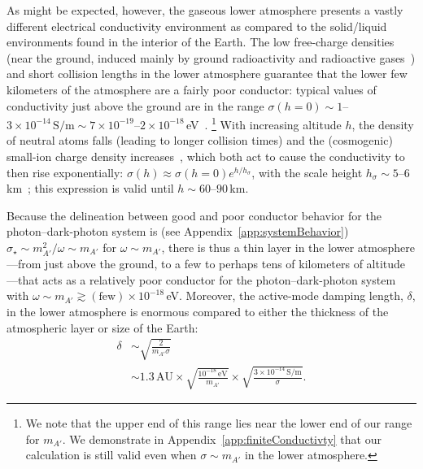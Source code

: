 \documentclass[amsmath,amssymb,aps,10pt,prd,letterpaper,nofootinbib,balancelastpage,notitlepage,superscriptaddress,twocolumn,floatfix]{revtex4-2}
\newcommand{\appref}[2][x]{Appendi{#1}~\ref{#2}}	%
\begin{document}
As might be expected, however, the gaseous lower atmosphere presents a vastly different electrical conductivity environment as compared to the solid/liquid environments found in the interior of the Earth.
The low free-charge densities (near the ground, induced mainly by ground radioactivity and radioactive gases~\cite{Handbook20.1}) and short collision lengths in the lower atmosphere guarantee that the lower few kilometers of the atmosphere are a fairly poor conductor: typical values of conductivity just above the ground are in the range 
$\sigma(h=0) \sim 1$--$3\times 10^{-14}\,\text{S/m}\sim 7\times 10^{-19}$--$2\times 10^{-18}$\,eV~\cite{Handbook20.1}.%
\footnote{\label{ftnt:conductivity}%
    We note that the upper end of this range lies near the lower end of our range for $m_{A'}$.  
    We demonstrate in \appref{app:finiteConductivty} that our calculation is still valid even when $\sigma\sim m_{A'}$ in the lower atmosphere.
} %
With increasing altitude $h$, the density of neutral atoms falls (leading to longer collision times) and the (cosmogenic) small-ion charge density increases~\cite{Handbook20.1}, which both act to cause the conductivity to then rise exponentially: $\sigma(h) \approx \sigma(h=0) e^{h/h_\sigma}$, with the scale height $h_\sigma \sim 5$--$6\,$km~\cite{Handbook20.1}; this expression is valid until $h\sim 60$--$90$\,km.

Because the delineation between good and poor conductor behavior for the photon--dark-photon system is (see \appref{app:systemBehavior}) $\sigma_{\star} \sim m_{A'}^2/\omega \sim m_{A'}$ for $\omega \sim m_{A'}$, there is thus a thin layer in the lower atmosphere---from just above the ground, to a few to perhaps tens of kilometers of altitude---that acts as a relatively poor conductor for the photon--dark-photon system with $\omega \sim m_{A'} \gtrsim (\text{few}) \times 10^{-18}\,$eV. 
Moreover, the active-mode damping length, $\delta$, in the lower atmosphere is enormous compared to either the thickness of the atmospheric layer or size of the Earth: 
\begin{align}
    \delta &\sim \sqrt{\frac{2}{m_{A'}\sigma}} \nonumber \\
    &\sim 1.3\,\text{AU}\times \sqrt{\frac{10^{-18}\,\text{eV}}{m_{A'}}} \times \sqrt{ \frac{ 3\times 10^{-14}\,\text{S/m}}{\sigma }}.
    \label{eq:dampAtmos}
\end{align} 
\end{document}
